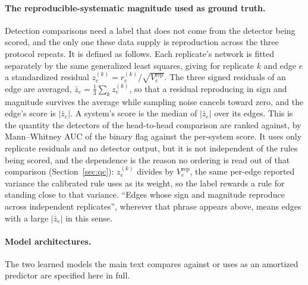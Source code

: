 \paragraph{The reproducible-systematic magnitude used as ground truth.} Detection comparisons
need a label that does not come from the detector being scored, and the only one these data
supply is reproduction across the three protocol repeats. It is defined as follows. Each
replicate's network is fitted separately by the same generalized least squares, giving for
replicate $k$ and edge $e$ a standardized residual $z_e^{(k)}=r_e^{(k)}/\sqrt{V_e^{\mathrm{rep}}}$.
The three signed residuals of an edge are averaged, $\bar z_e=\frac13\sum_k z_e^{(k)}$, so
that a residual reproducing in sign and magnitude survives the average while sampling noise
cancels toward zero, and the edge's score is $|\bar z_e|$. A system's score is the median of
$|\bar z_e|$ over its edges. This is the quantity the detectors of the head-to-head comparison
are ranked against, by Mann--Whitney AUC of the binary flag against the per-system score. It uses
only replicate residuals and no detector output, but it is not independent of the rules being
scored, and the dependence is the reason no ordering is read out of that comparison
(Section~\ref{sec:qc}): $z_e^{(k)}$ divides by $V_e^{\mathrm{rep}}$, the same per-edge reported
variance the calibrated rule uses as its weight, so the label rewards a rule for standing close to
that variance. ``Edges whose sign and magnitude
reproduce across independent replicates'', wherever that phrase appears above, means edges with a
large $|\bar z_e|$ in this sense.

\paragraph{Model architectures.} The two learned models the main text compares against or
uses as an amortized predictor are specified here in full.

